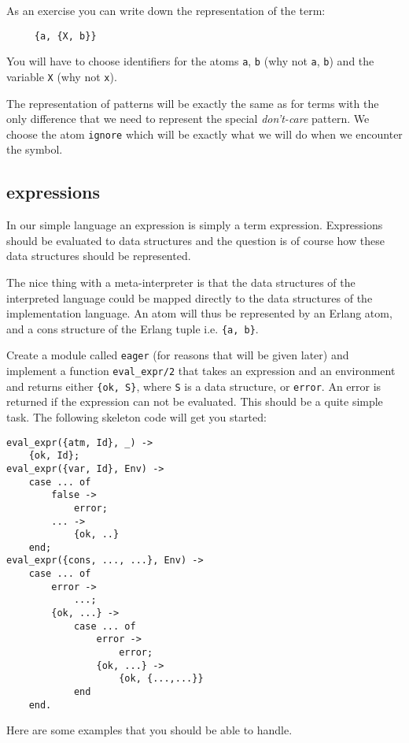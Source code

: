 \documentclass[a4paper,11pt]{article}
\begin{document}
As an exercise you can write down the representation of the term:

\begin{verbatim}
     {a, {X, b}}
\end{verbatim}

You will have to choose identifiers for the atoms {\tt a}, {\tt b}
(why not {\tt a}, {\tt b}) and the variable {\tt X} (why
not {\tt x}).

The representation of patterns will be exactly the same as for terms
with the only difference that we need to represent the special {\em
  don't-care} pattern. We choose the atom {\tt ignore} which will be
exactly what we will do when we encounter the symbol.

\subsection{expressions}

In our simple language an expression is simply a term
expression. Expressions should be evaluated to data structures and the
question is of course how these data structures should be represented.

The nice thing with a meta-interpreter is that the data structures of
the interpreted language could be mapped directly to the data
structures of the implementation language. An atom will thus be
represented by an Erlang atom, and a cons structure of the Erlang tuple
 i.e. {\tt \{a, b\}}. 

Create a module called {\tt eager} (for reasons that will be given
later) and implement a function {\tt eval\_expr/2} that takes an
expression and an environment and returns either {\tt \{ok, S\}},
where {\tt S} is a data structure, or {\tt error}. An error is
returned if the expression can not be evaluated. This should be a
quite simple task. The following skeleton code will get you started:

\begin{verbatim}
eval_expr({atm, Id}, _) ->
    {ok, Id};
eval_expr({var, Id}, Env) ->
    case ... of
        false ->
            error;
        ... ->
            {ok, ..}
    end;
eval_expr({cons, ..., ...}, Env) ->
    case ... of
        error ->
            ...;
        {ok, ...} ->
            case ... of
                error ->
                    error;
                {ok, ...} -> 
                    {ok, {...,...}}
            end
    end.
\end{verbatim}

Here are some examples that you should be able to handle.
\end{document}

